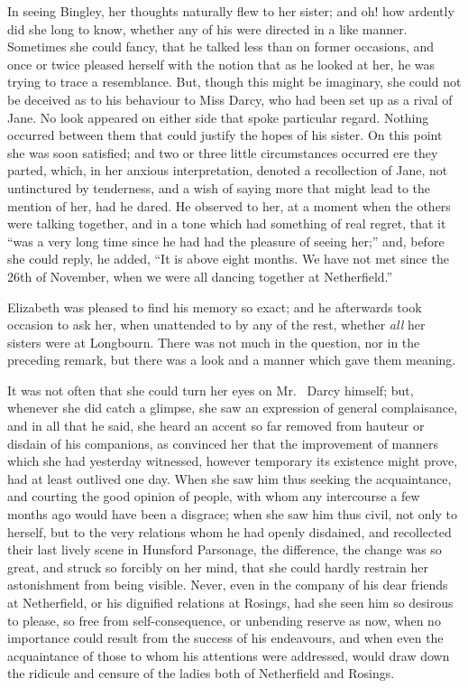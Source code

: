 In seeing Bingley, her thoughts naturally flew to her
sister; and oh! how ardently did she long to know,
whether any of his were directed in a like manner.
Sometimes she could fancy, that he talked less than on
former occasions, and once or twice pleased herself with
the notion that as he looked at her, he was trying to trace
a resemblance. But, though this might be imaginary, she
could not be deceived as to his behaviour to Miss Darcy,
who had been set up as a rival of Jane. No look appeared
on either side that spoke particular regard. Nothing
occurred between them that could justify the hopes of
his sister. On this point she was soon satisfied; and two
or three little circumstances occurred ere they parted,
which, in her anxious interpretation, denoted a recollection
of Jane, not untinctured by tenderness, and a wish of
saying more that might lead to the mention of her, had
he dared. He observed to her, at a moment when the
others were talking together, and in a tone which had
something of real regret, that it “was a very long time
since he had had the pleasure of seeing her;” and, before
she could reply, he added, “It is above eight months.
We have not met since the 26th of November, when we
were all dancing together at Netherfield.”

Elizabeth was pleased to find his memory so exact;
and he afterwards took occasion to ask her, when
unattended to by any of the rest, whether \textit{all} her sisters
were at Longbourn. There was not much in the question,
nor in the preceding remark, but there was a look and
a manner which gave them meaning.

It was not often that she could turn her eyes on Mr.\ %
Darcy himself; but, whenever she did catch a glimpse,
she saw an expression of general complaisance, and in all
that he said, she heard an accent so far removed from
hauteur or disdain of his companions, as convinced her
that the improvement of manners which she had yesterday
witnessed, however temporary its existence might prove,
had at least outlived one day. When she saw him thus
seeking the acquaintance, and courting the good opinion
of people, with whom any intercourse a few months ago
would have been a disgrace; when she saw him thus civil,
not only to herself, but to the very relations whom he had
openly disdained, and recollected their last lively scene
in Hunsford Parsonage, the difference, the change was
so great, and struck so forcibly on her mind, that she
could hardly restrain her astonishment from being visible.
Never, even in the company of his dear friends at Netherfield,
or his dignified relations at Rosings, had she seen
him so desirous to please, so free from self-consequence,
or unbending reserve as now, when no importance could
result from the success of his endeavours, and when even
the acquaintance of those to whom his attentions were
addressed, would draw down the ridicule and censure of
the ladies both of Netherfield and Rosings.

